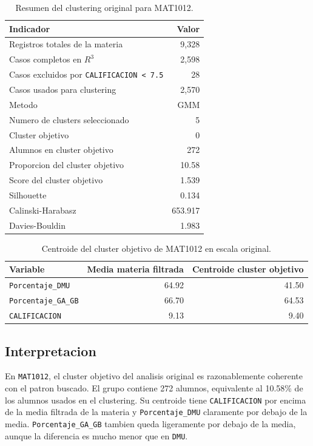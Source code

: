 \documentclass[11pt,letterpaper]{article}
\newcommand{\code}[1]{\texttt{#1}}
\begin{document}
\begin{table}[H]
\centering
\caption{Resumen del clustering original para MAT1012.}
\begin{tabular}{lr}
\toprule
Indicador & Valor \\
\midrule
Registros totales de la materia & 9,328 \\
Casos completos en $R^3$ & 2,598 \\
Casos excluidos por \code{CALIFICACION < 7.5} & 28 \\
Casos usados para clustering & 2,570 \\
Metodo & GMM \\
Numero de clusters seleccionado & 5 \\
Cluster objetivo & 0 \\
Alumnos en cluster objetivo & 272 \\
Proporcion del cluster objetivo & 10.58 \\
Score del cluster objetivo & 1.539 \\
Silhouette & 0.134 \\
Calinski-Harabasz & 653.917 \\
Davies-Bouldin & 1.983 \\
\bottomrule
\end{tabular}
\end{table}

\begin{table}[H]
\centering
\caption{Centroide del cluster objetivo de MAT1012 en escala original.}
\begin{tabular}{lrr}
\toprule
Variable & Media materia filtrada & Centroide cluster objetivo \\
\midrule
\code{Porcentaje\_DMU} & 64.92 & 41.50 \\
\code{Porcentaje\_GA\_GB} & 66.70 & 64.53 \\
\code{CALIFICACION} & 9.13 & 9.40 \\
\bottomrule
\end{tabular}
\end{table}

\subsection{Interpretacion}

En \code{MAT1012}, el cluster objetivo del analisis original es razonablemente coherente con el patron buscado. El grupo contiene 272 alumnos, equivalente al 10.58\% de los alumnos usados en el clustering. Su centroide tiene \code{CALIFICACION} por encima de la media filtrada de la materia y \code{Porcentaje\_DMU} claramente por debajo de la media. \code{Porcentaje\_GA\_GB} tambien queda ligeramente por debajo de la media, aunque la diferencia es mucho menor que en \code{DMU}.
\end{document}
